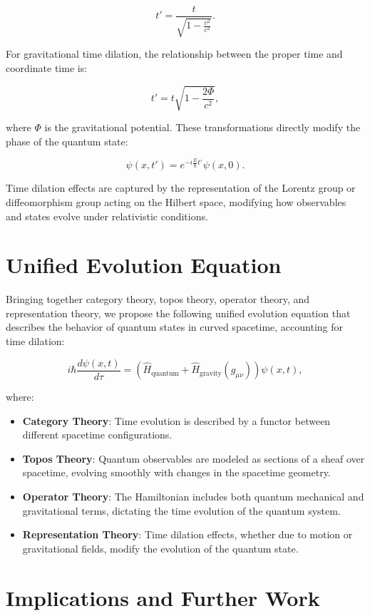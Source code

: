 \documentclass{article}
\begin{document}
\[
t' = \frac{t}{\sqrt{1 - \frac{v^2}{c^2}}}.
\]

For gravitational time dilation, the relationship between the proper time and coordinate time is:

\[
t' = t \sqrt{1 - \frac{2 \Phi}{c^2}},
\]

where \( \Phi \) is the gravitational potential. These transformations directly modify the phase of the quantum state:

\[
\psi(x, t') = e^{-i \frac{E}{\hbar} t'} \psi(x, 0).
\]

Time dilation effects are captured by the representation of the Lorentz group or diffeomorphism group acting on the Hilbert space, modifying how observables and states evolve under relativistic conditions.

\section{Unified Evolution Equation}

Bringing together category theory, topos theory, operator theory, and representation theory, we propose the following unified evolution equation that describes the behavior of quantum states in curved spacetime, accounting for time dilation:

\[
i \hbar \frac{d \psi(x, t)}{d \tau} = \left( \hat{H}_{\text{quantum}} + \hat{H}_{\text{gravity}}(g_{\mu\nu}) \right) \psi(x, t),
\]

where:

\begin{itemize}
    \item \textbf{Category Theory}: Time evolution is described by a functor between different spacetime configurations.
    \item \textbf{Topos Theory}: Quantum observables are modeled as sections of a sheaf over spacetime, evolving smoothly with changes in the spacetime geometry.
    \item \textbf{Operator Theory}: The Hamiltonian includes both quantum mechanical and gravitational terms, dictating the time evolution of the quantum system.
    \item \textbf{Representation Theory}: Time dilation effects, whether due to motion or gravitational fields, modify the evolution of the quantum state.
\end{itemize}

\section{Implications and Further Work}
\end{document}
